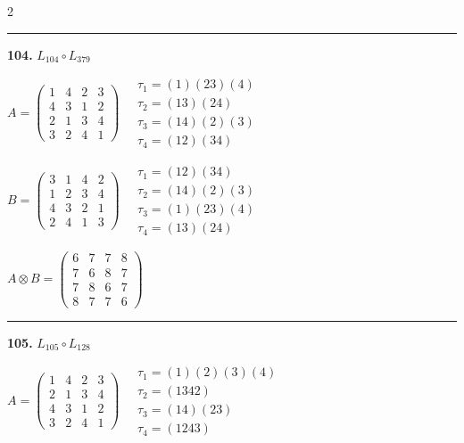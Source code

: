 \begin{multicols}{2}
\vspace{0.3em}
\hrule
\vspace{0.3em}

\noindent\textbf{104.} $L_{104} \circ L_{379}$

$A = \begin{pmatrix} 1 & 4 & 2 & 3 \\ 4 & 3 & 1 & 2 \\ 2 & 1 & 3 & 4 \\ 3 & 2 & 4 & 1 \end{pmatrix} \quad \begin{matrix} \tau_{1}=(1)(2 3)(4) \\ \tau_{2}=(1 3)(2 4) \\ \tau_{3}=(1 4)(2)(3) \\ \tau_{4}=(1 2)(3 4) \end{matrix}$

$B = \begin{pmatrix} 3 & 1 & 4 & 2 \\ 1 & 2 & 3 & 4 \\ 4 & 3 & 2 & 1 \\ 2 & 4 & 1 & 3 \end{pmatrix} \quad \begin{matrix} \tau_{1}=(1 2)(3 4) \\ \tau_{2}=(1 4)(2)(3) \\ \tau_{3}=(1)(2 3)(4) \\ \tau_{4}=(1 3)(2 4) \end{matrix}$

$A \otimes B = \begin{pmatrix} 6 & 7 & 7 & 8 \\ 7 & 6 & 8 & 7 \\ 7 & 8 & 6 & 7 \\ 8 & 7 & 7 & 6 \end{pmatrix}$

\vspace{0.3em}
\hrule
\vspace{0.3em}

\noindent\textbf{105.} $L_{105} \circ L_{128}$

$A = \begin{pmatrix} 1 & 4 & 2 & 3 \\ 2 & 1 & 3 & 4 \\ 4 & 3 & 1 & 2 \\ 3 & 2 & 4 & 1 \end{pmatrix} \quad \begin{matrix} \tau_{1}=(1)(2)(3)(4) \\ \tau_{2}=(1 3 4 2) \\ \tau_{3}=(1 4)(2 3) \\ \tau_{4}=(1 2 4 3) \end{matrix}$


\end{multicols}
